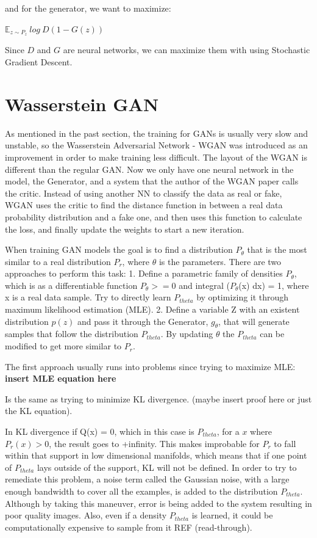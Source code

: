 \documentclass{article}
\begin{document}
and for the generator, we want to maximize:

\begin{center}
	$\mathbb{E}_{z \sim P_z}~log~D(1-G(z))$
\end{center}

Since $D$ and $G$ are neural networks, we can maximize them with using Stochastic Gradient Descent. 

\section{Wasserstein GAN}

As mentioned in the past section, the training for GANs is usually very slow and unstable, so the Wasserstein Adversarial Network - WGAN was introduced as an improvement in order to make training less difficult. The layout of the WGAN is different than the regular GAN. Now we only have one neural network in the model, the Generator, and a system that the author of the WGAN paper \cite{Arjovsky2017} calls the critic. Instead of using another NN to classify the data as real or fake, WGAN uses the critic to find the distance function in between a real data probability distribution and a fake one, and then uses this function to calculate the loss, and finally update the weights to start a new iteration.

When training GAN models the goal is to find a distribution $P_{\theta}$ that is the most similar to a real distribution $P_{r}$, where $\theta$ is the parameters. There are two approaches to perform this task:
1. Define a parametric family of densities $P_{\theta}$, which is as a differentiable function $P_{\theta} >= 0$ and integral ($P_{\theta}$(x) dx) = 1, where x is a real data sample. Try to directly learn $P_{theta}$ by optimizing it through maximum likelihood estimation (MLE).
2. Define a variable Z with an existent distribution $p(z)$ and pass it through the Generator, $g_{\theta}$, that will generate samples that follow the distribution $P_{theta}$. By updating $\theta$ the $P_{theta}$ can be modified to get more similar to $P_{r}$.

The first approach usually runs into problems since trying to maximize MLE:
\textbf{insert MLE equation here}

Is the same as trying to minimize KL divergence.
(maybe insert proof here or just the KL equation).

In KL divergence if Q(x) = 0, which in this case is $P_{theta}$, for a $x$ where $P_{r}(x) > 0$, the result goes to +infinity. This makes improbable for $P_{r}$ to fall within that support in low dimensional manifolds, which means that if one point of $P_{theta}$ lays outside of the support, KL will not be defined. In order to try to remediate this problem, a noise term called the Gaussian noise, with a large enough bandwidth to cover all the examples, is added to the distribution $P_{theta}$. Although by taking this maneuver, error is being added to the system resulting in poor quality images. Also, even if a density $P_{theta}$ is learned, it could be computationally expensive to sample from it REF (read-through).
\end{document}
